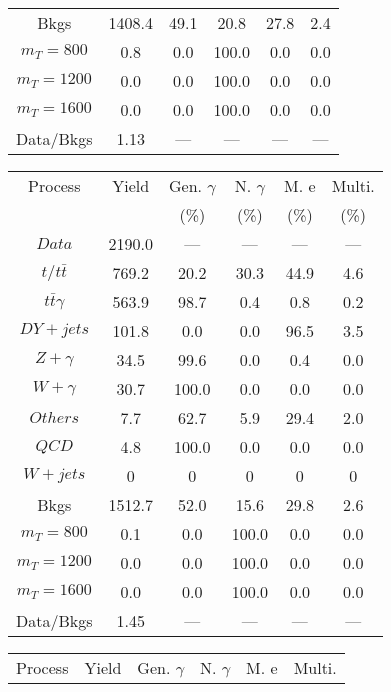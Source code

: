 \begin{figure}
\begin{minipage}[c]{0.32\textwidth}
{\begin{tabular}{cccccc}
Bkgs &  1408.4 &  49.1 &  20.8 &  27.8 &  2.4\\
$ m_{T} = 800 $ &  0.8 &  0.0 &  100.0 &  0.0 &  0.0\\
$ m_{T} = 1200 $ &  0.0 &  0.0 &  100.0 &  0.0 &  0.0\\
$ m_{T} = 1600 $ &  0.0 &  0.0 &  100.0 &  0.0 &  0.0\\
Data/Bkgs &  1.13 &  --- &  --- &  --- &  ---\\
\hline
\end{tabular}
}
\end{minipage}
\begin{minipage}[c]{0.32\textwidth}
\centering
\tiny{
\begin{tabular}{cccccc}
\hline
Process & Yield & Gen. $\gamma$ & N. $\gamma$ & M. e & Multi. \\
 &  & (\%) & (\%) & (\%) & (\%)  \\
\hline
                                                                      $ Data $ &  2190.0 &  --- &  --- &  --- &  ---\\
$ t/t\bar{t} $ &  769.2 &  20.2 &  30.3 &  44.9 &  4.6\\
$ t\bar{t}\gamma $ &  563.9 &  98.7 &  0.4 &  0.8 &  0.2\\
$ DY+jets $ &  101.8 &  0.0 &  0.0 &  96.5 &  3.5\\
$ Z+\gamma $ &  34.5 &  99.6 &  0.0 &  0.4 &  0.0\\
$ W+\gamma $ &  30.7 &  100.0 &  0.0 &  0.0 &  0.0\\
$ Others $ &  7.7 &  62.7 &  5.9 &  29.4 &  2.0\\
$ QCD $ &  4.8 &  100.0 &  0.0 &  0.0 &  0.0\\
$ W+jets $ &  0 &  0 &  0 &  0 &  0\\
Bkgs &  1512.7 &  52.0 &  15.6 &  29.8 &  2.6\\
$ m_{T} = 800 $ &  0.1 &  0.0 &  100.0 &  0.0 &  0.0\\
$ m_{T} = 1200 $ &  0.0 &  0.0 &  100.0 &  0.0 &  0.0\\
$ m_{T} = 1600 $ &  0.0 &  0.0 &  100.0 &  0.0 &  0.0\\
Data/Bkgs &  1.45 &  --- &  --- &  --- &  ---\\
\hline
\end{tabular}
}
\end{minipage}
\begin{minipage}[c]{0.32\textwidth}
\centering
\tiny{
\begin{tabular}{cccccc}
\hline
Process & Yield & Gen. $\gamma$ & N. $\gamma$ & M. e & Multi. \\

\end{tabular}}
\end{minipage}
\end{figure}
